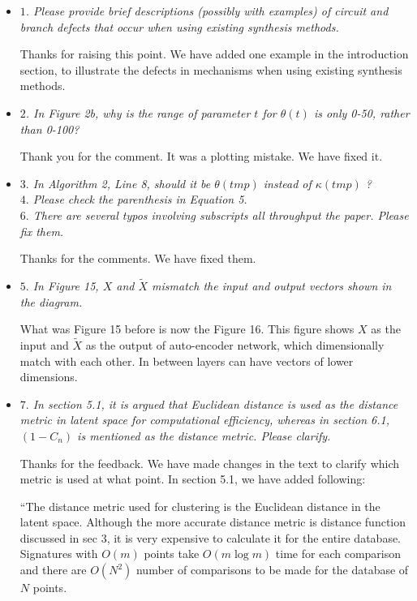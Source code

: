 \documentclass{article}
\begin{document}
\begin{itemize}
  \item[] \emph{
$1$. Please provide brief descriptions (possibly with examples) of circuit and branch defects that
occur when using existing synthesis methods.
}

Thanks for raising this point.
We have added one example in the introduction section, to illustrate the defects in mechanisms when using existing synthesis methods.
\\

  \item[] \emph{
  $2$. In Figure 2b, why is the range of parameter $t$ for $\theta(t)$ is only 0-50, rather than 0-100?
}

Thank you for the comment. It was a plotting mistake. We have fixed it.
\\

  \item[] \emph{
$3.$ In Algorithm 2, Line 8, should it be $\theta(tmp)$ instead of $\kappa(tmp)$ ?\\
$4.$ Please check the parenthesis in Equation 5.\\
$6.$ There are several typos involving subscripts all throughput the paper. Please fix them.
}

Thanks for the comments. We have fixed them.
\\

  \item[] \emph{
$5.$ In Figure 15, $X$ and $\tilde{X}$ mismatch the input and output vectors shown in the diagram.
}

What was Figure 15 before is now the Figure 16. This figure shows $X$ as the input and $\tilde{X}$ as the output of auto-encoder network, which dimensionally match with each other. In between layers can have vectors of lower dimensions.
\\


  \item[] \emph{
$7.$ In section 5.1, it is argued that Euclidean distance is used as the distance metric in latent space for
computational efficiency, whereas in section 6.1, $(1 - C_n)$ is mentioned as the distance
metric. Please clarify.
}

Thanks for the feedback. We have made changes in the text to clarify which metric is used at what point.
In section 5.1, we have added following:

``The distance metric used for clustering is the Euclidean distance in the latent space.
Although the more accurate distance metric is distance function discussed in sec 3, it is very expensive to calculate it for the entire database.
Signatures with ${O}(m)$ points take ${O}(m\log{}m)$ time for each comparison and there are ${O}(N^2)$ number of comparisons to be made for the database of $N$ points.


\end{itemize}
\end{document}
